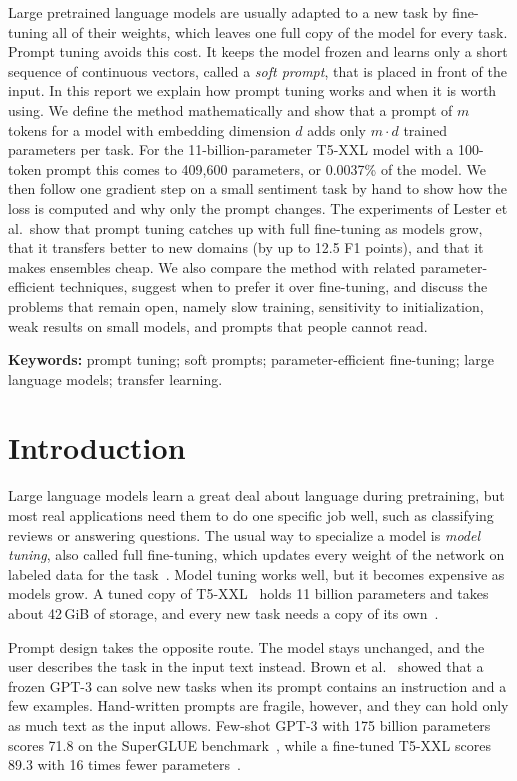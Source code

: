 \documentclass[12pt]{article}
\begin{document}
Large pretrained language models are usually adapted to a new task by fine-tuning all of
their weights, which leaves one full copy of the model for every task. Prompt tuning avoids
this cost. It keeps the model frozen and learns only a short sequence of continuous vectors,
called a \emph{soft prompt}, that is placed in front of the input. In this report we explain
how prompt tuning works and when it is worth using. We define the method mathematically and
show that a prompt of $m$ tokens for a model with embedding dimension $d$ adds only $m\cdot d$
trained parameters per task. For the 11-billion-parameter T5-XXL model with a 100-token
prompt this comes to 409,600 parameters, or 0.0037\% of the model. We then follow one gradient step
on a small sentiment task by hand to show how the loss is computed and why only the prompt
changes. The experiments of Lester et al.\ show that prompt tuning catches up with full
fine-tuning as models grow, that it transfers better to new domains (by up to 12.5 F1
points), and that it makes ensembles cheap. We also compare the method with related
parameter-efficient techniques, suggest when to prefer it over fine-tuning, and discuss the
problems that remain open, namely slow training, sensitivity to initialization, weak results
on small models, and prompts that people cannot read.

\vspace{0.8em}
\noindent\textbf{Keywords:} prompt tuning; soft prompts; parameter-efficient fine-tuning;
large language models; transfer learning.

\newpage
{\tableofcontents}
\newpage

\section{Introduction}\label{sec:intro}

Large language models learn a great deal about language during pretraining, but most real
applications need them to do one specific job well, such as classifying reviews or
answering questions. The usual way to specialize a model is \emph{model tuning}, also called
full fine-tuning, which updates every weight of the network on labeled data for the
task~\cite{lester2021}. Model tuning works well, but it becomes expensive as models grow. A
tuned copy of T5-XXL~\cite{raffel2020} holds 11 billion parameters and takes about 42\,GiB of
storage, and every new task needs a copy of its own~\cite{lester2021}.

Prompt design takes the opposite route. The model stays unchanged, and the user describes the
task in the input text instead. Brown et al.~\cite{brown2020} showed that a frozen GPT-3 can solve
new tasks when its prompt contains an instruction and a few examples. Hand-written prompts
are fragile, however, and they can hold only as much text as the input allows. Few-shot
GPT-3 with 175 billion parameters scores 71.8 on the SuperGLUE
benchmark~\cite{wang2019superglue}, while a fine-tuned T5-XXL scores 89.3 with 16 times fewer
parameters~\cite{lester2021}.
\end{document}
